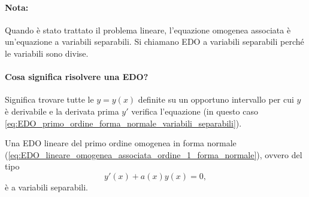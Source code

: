 \paragraph{Nota:} Quando è stato trattato il problema lineare, l'equazione omogenea associata è un'equazione a variabili separabili. Si chiamano EDO a variabili separabili perché le variabili sono divise.

\paragraph{Cosa significa risolvere una EDO?} Significa trovare tutte le $y=y(x)$ definite su un opportuno intervallo per cui $y$ è derivabile e la derivata prima $y'$ verifica l'equazione (in questo caso \ref{eq:EDO_primo_ordine_forma_normale_variabili_separabili}). 

\begin{remark}
    Una EDO lineare del primo ordine omogenea in forma normale (\ref{eq:EDO_lineare_omogenea_associata_ordine_1_forma_normale}), ovvero del tipo
    \begin{equation*}
        y'(x) + a(x) y(x) = 0,
    \end{equation*}
    è a variabili separabili.
\end{remark}

